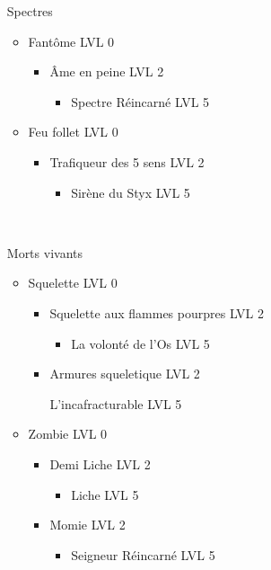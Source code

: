 \begin{itemize}
	\item[Spectres]~\\
		\begin{itemize}
			\item Fantôme LVL 0
				\begin{itemize}
					\item Âme en peine LVL 2
						\begin{itemize}
							\item Spectre Réincarné LVL 5
						\end{itemize}
				\end{itemize}
			\item Feu follet LVL 0
				\begin{itemize}
					\item Trafiqueur des 5 sens LVL 2
						\begin{itemize}
							\item Sirène du Styx LVL 5
						\end{itemize}
				\end{itemize}
		\end{itemize}~\\
	\item[Morts vivants] ~\\
		\begin{itemize}
			\item Squelette LVL 0
				\begin{itemize}
					\item Squelette aux flammes pourpres LVL 2
						\begin{itemize}
							\item La volonté de l'Os LVL 5
						\end{itemize}
					\item Armures squeletique LVL 2
						\begin{itemize}
							L'incafracturable LVL 5
						\end{itemize}
				\end{itemize}
			\item Zombie LVL 0
				\begin{itemize}
					\item Demi Liche LVL 2
						\begin{itemize}
							\item Liche LVL 5
						\end{itemize}
					\item Momie LVL 2
						\begin{itemize}
							\item Seigneur Réincarné LVL 5

\end{itemize}
\end{itemize}
\end{itemize}
\end{itemize}
